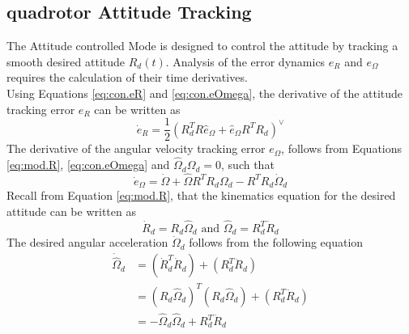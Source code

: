 
\subsection{quadrotor Attitude Tracking}\label{sec:con.qratt}
The  Attitude controlled Mode is designed to control the  attitude by tracking a smooth desired  attitude $ R_d(t) $.  
Analysis of the error dynamics $ e_R $ and $ e_\Omega $ requires the calculation of their time derivatives.\\
Using Equations \ref{eq:con.eR} and \ref{eq:con.eOmega}, the derivative of the attitude tracking error $ e_R $ can be written as
\begin{equation}\label{key}
\dot{e}_R=\frac{1}{2}(R_d^TR\hat{e}_\Omega+\hat{e}_\Omega R^TR_d)^\vee
\end{equation}
The derivative of the angular velocity tracking error $ e_\Omega $, follows from Equations \ref{eq:mod.R}, \ref{eq:con.eOmega} and $ \hat{\Omega}_d\Omega_d =0$, such that
\begin{equation}\label{eq:con.deOmega}
\dot{e}_\Omega=\dot{\Omega}+\hat{\Omega}R^TR_d\Omega_d-R^TR_d\dot{\Omega}_d
\end{equation}
Recall from Equation \ref{eq:mod.R}, that the kinematics equation for the desired attitude can be written as
\begin{equation}\label{eq:con.dotRd}
\dot{R}_d=R_d\hat{\Omega}_d \text{ and } \hat{\Omega}_d=R_d^T\dot{R}_d
\end{equation}
The desired angular acceleration $ \dot{\Omega}_d $ follows from the following equation
\begin{equation}
\begin{aligned}
\dot{\hat{\Omega}}_d&=(\dot{R}_d^T\dot{R}_d)+(R_d^T\ddot{R}_d)\\
&=(R_d\hat{\Omega}_d)^T(R_d\hat{\Omega}_d)+(R_d^T\ddot{R}_d)\\
&=-\hat{\Omega}_d\hat{\Omega}_d+R_d^T\ddot{R}_d
\end{aligned}
\end{equation}
